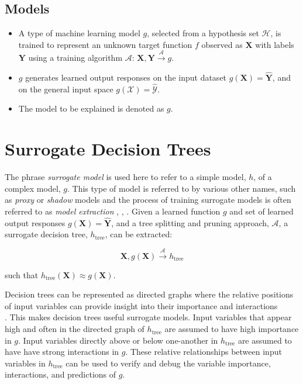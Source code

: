 \documentclass{article}
\begin{document}
\subsection{Models}

	\begin{itemize}
		\item A type of machine learning model $g$, selected from a hypothesis set $\mathcal{H}$, is trained to represent an unknown target function $f$ observed as  $\mathbf{X}$ with labels $\mathbf{Y}$ using a training algorithm $\mathcal{A}$: 
		$ \mathbf{X}, \mathbf{Y} \xrightarrow{\mathcal{A}} g$.
		\item $g$ generates learned output responses on the input dataset $g(\mathbf{X}) = \mathbf{\hat{Y}}$, and on the general input space $g(\mathcal{X}) = \mathcal{\hat{Y}}$.
		\item The model to be explained is denoted as $g$.
	\end{itemize}

\section{Surrogate Decision Trees} \label{sec:surrogate_dt}

The phrase \textit{surrogate model} is used here to refer to a simple model, $h$, of a complex model, $g$. This type of model is referred to by various other names, such as \textit{proxy} or \textit{shadow} models and the process of training surrogate models is often referred to as \textit{model extraction} \cite{dt_surrogate1}, \cite{ff_interpretability},  \cite{dt_surrogate2}. Given a learned function $g$ and set of learned output responses $g(\mathbf{X}) = \mathbf{\hat{Y}}$, and a tree splitting and pruning approach, $\mathcal{A}$, a surrogate decision tree, $h_{\text{tree}}$, can be extracted: 

\begin{equation}
\mathbf{X}, g(\mathbf{X}) \xrightarrow{\mathcal{A}} h_{\text{tree}}
\end{equation}

such that $h_{\text{tree}}(\mathbf{X}) \approx g(\mathbf{X})$. 

Decision trees can be represented as directed graphs where the relative positions of input variables can provide insight into their importance and interactions \\ \cite{cart}. This makes decision trees useful surrogate models. Input variables that appear high and often in the directed graph of $h_{\text{tree}}$ are assumed to have high importance in $g$. Input variables directly above or below one-another in $h_{\text{tree}}$ are assumed to have have strong interactions in $g$. These relative relationships between input variables in $h_{\text{tree}}$ can be used to verify and debug the variable importance, interactions, and predictions of $g$.
\end{document}
